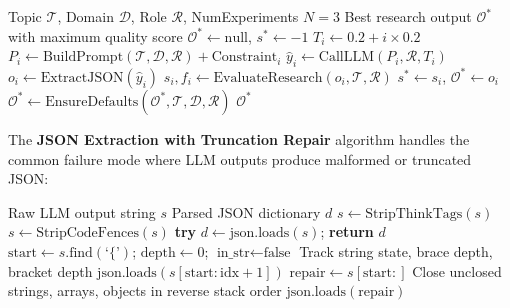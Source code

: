 \begin{algorithm}[H]
\caption{Tournament-Based Research Agent Execution}
\label{alg:tournament}
\begin{algorithmic}[1]
\Require Topic $\mathcal{T}$, Domain $\mathcal{D}$, Role $\mathcal{R}$, NumExperiments $N=3$
\Ensure Best research output $\mathcal{O}^*$ with maximum quality score
\State $\mathcal{O}^* \gets \text{null}$, $s^* \gets -1$
 
    \State $T_i \gets 0.2 + i \times 0.2$ 
    \State $P_i \gets \text{BuildPrompt}(\mathcal{T}, \mathcal{D}, \mathcal{R}) + \text{Constraint}_i$
    \State $\hat{y}_i \gets \text{CallLLM}(P_i, \mathcal{R}, T_i)$ 
    \State $o_i \gets \text{ExtractJSON}(\hat{y}_i)$ 
    \State $s_i, f_i \gets \text{EvaluateResearch}(o_i, \mathcal{T}, \mathcal{R})$ 
        \State $s^* \gets s_i$, $\mathcal{O}^* \gets o_i$
    \EndIf
\EndFor
\State $\mathcal{O}^* \gets \text{EnsureDefaults}(\mathcal{O}^*, \mathcal{T}, \mathcal{D}, \mathcal{R})$
\State \Return $\mathcal{O}^*$
\end{algorithmic}
\end{algorithm}

The \textbf{JSON Extraction with Truncation Repair} algorithm handles the common failure mode where LLM outputs produce malformed or truncated JSON:

\begin{algorithm}[H]
\caption{Balanced-Brace JSON Extraction with Truncation Repair}
\label{alg:json}
\begin{algorithmic}[1]
\Require Raw LLM output string $s$
\Ensure Parsed JSON dictionary $d$
\State $s \gets \text{StripThinkTags}(s)$ 
\State $s \gets \text{StripCodeFences}(s)$ 
\State \textbf{try} $d \gets \text{json.loads}(s)$; \textbf{return} $d$
\State $\text{start} \gets s.\text{find}(\text{`\{'})$; $\text{depth} \gets 0$; $\text{in\_str} \gets \text{false}$
    \State Track string state, brace depth, bracket depth
        \State \Return $\text{json.loads}(s[\text{start}:\text{idx}+1])$ 
    \EndIf
\EndFor
\State $\text{repair} \gets s[\text{start}:]$ 
\State Close unclosed strings, arrays, objects in reverse stack order
\State \Return $\text{json.loads}(\text{repair})$
\end{algorithmic}
\end{algorithm}

